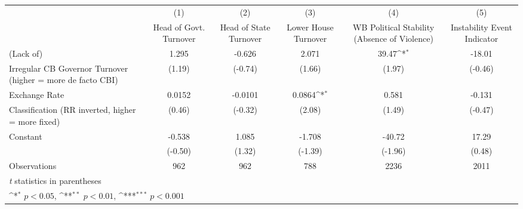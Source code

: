 {
\def\sym#1{\ifmmode^{#1}\else\(^{#1}\)\fi}
\begin{tabular}{l*{5}{c}}
\toprule
                &\multicolumn{1}{c}{(1)}&\multicolumn{1}{c}{(2)}&\multicolumn{1}{c}{(3)}&\multicolumn{1}{c}{(4)}&\multicolumn{1}{c}{(5)}\\
                &\multicolumn{1}{c}{Head of Govt. Turnover}&\multicolumn{1}{c}{Head of State Turnover}&\multicolumn{1}{c}{Lower House Turnover}&\multicolumn{1}{c}{WB Political Stability (Absence of Violence)}&\multicolumn{1}{c}{Instability Event Indicator}\\
\midrule
(Lack of)       &    1.295         &   -0.626         &    2.071         &    39.47\sym{*}  &   -18.01         \\
Irregular CB Governor Turnover (higher = more de facto CBI)&   (1.19)         &  (-0.74)         &   (1.66)         &   (1.97)         &  (-0.46)         \\
\addlinespace
Exchange Rate   &   0.0152         &  -0.0101         &   0.0864\sym{*}  &    0.581         &   -0.131         \\
Classification (RR inverted, higher = more fixed)&   (0.46)         &  (-0.32)         &   (2.08)         &   (1.49)         &  (-0.47)         \\
\addlinespace
Constant        &   -0.538         &    1.085         &   -1.708         &   -40.72         &    17.29         \\
                &  (-0.50)         &   (1.32)         &  (-1.39)         &  (-1.96)         &   (0.48)         \\
\midrule
Observations    &      962         &      962         &      788         &     2236         &     2011         \\
\bottomrule
\multicolumn{6}{l}{\footnotesize \textit{t} statistics in parentheses}\\
\multicolumn{6}{l}{\footnotesize \sym{*} \(p<0.05\), \sym{**} \(p<0.01\), \sym{***} \(p<0.001\)}\\
\end{tabular}
}
